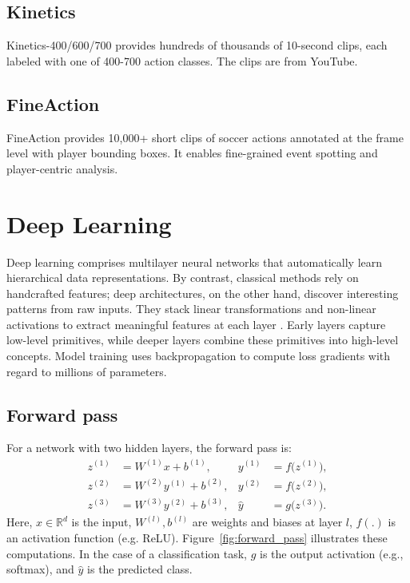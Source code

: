 \subsection{Kinetics}
Kinetics-400/600/700 \cite{dataset:kinetics} provides hundreds of thousands of 10-second clips, each labeled with one of 400-700 action classes. The clips are from YouTube.

\subsection{FineAction}
FineAction \cite{dataset:fineaction} provides 10,000+ short clips of soccer actions annotated at the frame level with player bounding boxes. It enables fine-grained event spotting and player-centric analysis.

\section{Deep Learning} 
\label{sec:deep_learning}

Deep learning comprises multilayer neural networks that automatically learn hierarchical data representations. By contrast, classical methods rely on handcrafted features; deep architectures, on the other hand, discover interesting patterns from raw inputs. They stack linear transformations and non-linear activations to extract meaningful features at each layer \cite{lecun_deep_learning_2015}. 
Early layers capture low-level primitives, while deeper layers combine these primitives into high-level concepts. Model training uses backpropagation to compute loss gradients with regard to millions of parameters. 

\subsection{Forward pass}
For a network with two hidden layers, the forward pass is:
\begin{align}
z^{(1)} &= W^{(1)} x + b^{(1)}, & y^{(1)} &= f\bigl(z^{(1)}\bigr), \\
z^{(2)} &= W^{(2)} y^{(1)} + b^{(2)}, & y^{(2)} &= f\bigl(z^{(2)}\bigr), \\
z^{(3)} &= W^{(3)} y^{(2)} + b^{(3)}, & \hat{y} &= g\bigl(z^{(3)}\bigr).
\end{align}
Here, \(x\in\mathbb{R}^d\) is the input, \(W^{(l)},b^{(l)}\) are weights and biases at layer \(l\), \(f(.)\) is an activation function (e.g. ReLU). Figure~\ref{fig:forward_pass} illustrates these computations. In the case of a classification task, \(g\) is the output activation (e.g., softmax), and \(\hat{y}\) is the predicted class.

